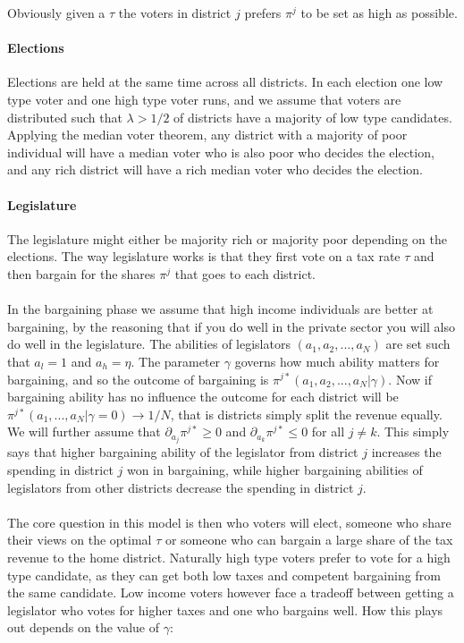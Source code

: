 Obviously given a $\tau$ the voters in district $j$ prefers $\pi^j$ to be set as high as possible.

\paragraph{Elections}
Elections are held at the same time across all districts. In each election one low type voter and one high type voter runs, and we assume that voters are distributed such that $\lambda>1/2$ of districts have a majority of low type candidates. Applying the median voter theorem, any district with a majority of poor individual will have a median voter who is also poor who decides the election, and any rich district will have a rich median voter who decides the election.

\paragraph{Legislature}
The legislature might either be majority rich or majority poor depending on the elections. The way legislature works is that they first vote on a tax rate $\tau$ and then bargain for the shares $\pi^j$ that goes to each district.
\\ \\ 
In the bargaining phase we assume that high income individuals are better at bargaining, by the reasoning that if you do well in the private sector you will also do well in the legislature. The abilities of legislators $(a_1, a_2,...,a_N)$ are set such that $a_l=1$ and $a_h = \eta$. The parameter $\gamma$ governs how much ability matters for bargaining, and so the outcome of bargaining is $\pi^{j*}(a_1,a_2,...,a_N|\gamma)$. Now if bargaining ability has no influence the outcome for each district will be $\pi^{j*}(a_1, ...,a_N|\gamma = 0)\rightarrow1/N$, that is districts simply split the revenue equally. We will further assume that $\partial_{a_j} \pi^{j*}\geq 0$ and $\partial_{a_k} \pi^{j*} \leq 0$ for all $j\neq k$. This simply says that higher bargaining ability of the legislator from district $j$ increases the spending in district $j$ won in bargaining, while higher bargaining abilities of legislators from other districts decrease the spending in district $j$.
\\ \\
The core question in this model is then who voters will elect, someone who share their views on the optimal $\tau$ or someone who can bargain a large share of the tax revenue to the home district. Naturally high type voters prefer to vote for a high type candidate, as they can get both low taxes and competent bargaining from the same candidate. Low income voters however face a tradeoff between getting a legislator who votes for higher taxes and one who bargains well. How this plays out depends on the value of $\gamma$:

